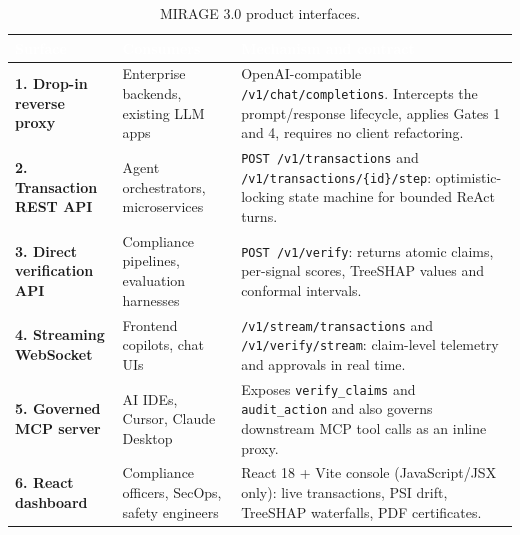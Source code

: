 \documentclass[11pt,a4paper]{article}
\newcommand{\hc}[1]{\textcolor{white}{\textbf{#1}}}
\newcommand{\hdrrow}{\rowcolor{primarynavy}}
\begin{document}
\begin{table}[!htbp]
\centering\small
\renewcommand{\arraystretch}{1.2}
\begin{tabularx}{\linewidth}{@{}L{3.1cm} L{3.2cm} Y@{}}
\hdrrow \hc{Surface} & \hc{Consumers} & \hc{Mechanism and contract}\\
\toprule
\textbf{1. Drop-in reverse proxy} & Enterprise backends, existing LLM apps & OpenAI-compatible \texttt{/v1/chat/completions}. Intercepts the prompt/response lifecycle, applies Gates 1 and 4, requires no client refactoring.\\
\textbf{2. Transaction REST API} & Agent orchestrators, microservices & \texttt{POST /v1/transactions} and \texttt{/v1/transactions/\{id\}/step}: optimistic-locking state machine for bounded ReAct turns.\\
\textbf{3. Direct verification API} & Compliance pipelines, evaluation harnesses & \texttt{POST /v1/verify}: returns atomic claims, per-signal scores, TreeSHAP values and conformal intervals.\\
\textbf{4. Streaming WebSocket} & Frontend copilots, chat UIs & \texttt{/v1/stream/transactions} and \texttt{/v1/verify/stream}: claim-level telemetry and approvals in real time.\\
\textbf{5. Governed MCP server} & AI IDEs, Cursor, Claude Desktop & Exposes \texttt{verify\_claims} and \texttt{audit\_action} and also governs downstream MCP tool calls as an inline proxy.\\
\textbf{6. React dashboard} & Compliance officers, SecOps, safety engineers & React 18 + Vite console (JavaScript/JSX only): live transactions, PSI drift, TreeSHAP waterfalls, PDF certificates.\\
\bottomrule
\end{tabularx}
\caption{MIRAGE 3.0 product interfaces.}
\label{tab:interfaces}
\end{table}
\end{document}
